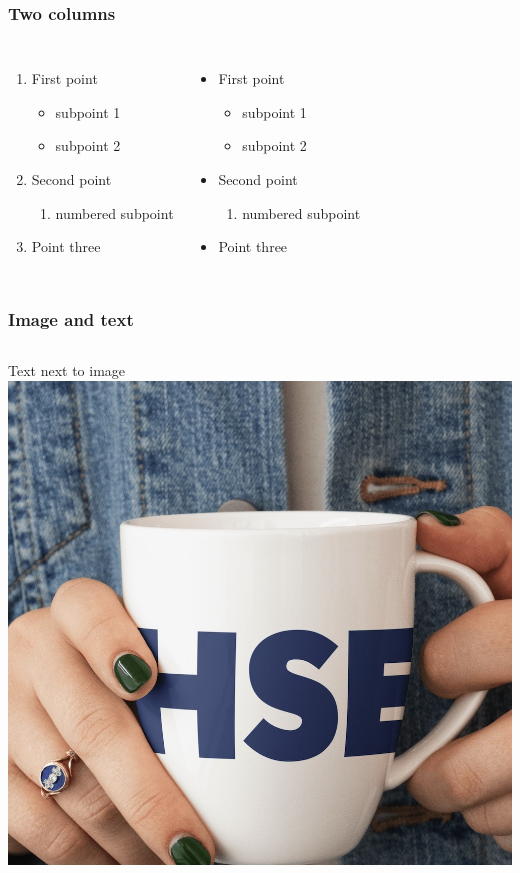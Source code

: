 \documentclass[aspectratio=169]{beamer}
\begin{document}
\begin{frame}
\frametitle{Two columns}
	 \begin{columns}
	\begin{enumerate} 
		\item First point
		\begin{itemize}
			\item subpoint 1
			\item subpoint 2
		\end{itemize}
		\item Second point
		\begin{enumerate}
			\item numbered subpoint
		\end{enumerate} 
		\item Point three
	\end{enumerate} 
	\begin{itemize}
		\item First point
		\begin{itemize}
			\item subpoint 1
			\item subpoint 2
		\end{itemize}
		\item Second point
		\begin{enumerate}
			\item numbered subpoint
		\end{enumerate} 
		\item Point three
	\end{itemize}
	\end{columns}
\end{frame}

\begin{frame}
\frametitle{Image and text}
\medskip
	 \begin{columns}
	 \column{0.5\textwidth}
		Text next to image
		\column{0.5\textwidth}
		\includegraphics[width=\columnwidth]{image1}
	\end{columns}
\end{frame}
\end{document}
